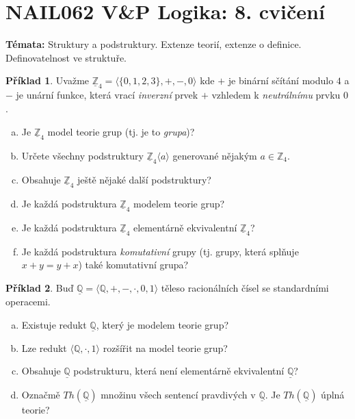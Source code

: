 \documentclass[a4paper]{article}
\theoremstyle{definition}
\newtheorem{problem}{Příklad}
\begin{document}
\section*{NAIL062 V\&P Logika: 8. cvičení}


\textbf{Témata:}
Struktury a podstruktury. Extenze teorií, extenze o definice. Definovatelnost ve struktuře.


\medskip\begin{problem}
    Uvažme $\underline{\mathbb{Z}}_4=\langle\{0,1,2,3\},+,-,0 \rangle$ kde $+$ je binární sčítání modulo $4$ a $-$ je unární funkce, která vrací \emph{inverzní} prvek $+$ vzhledem k \emph{neutrálnímu} prvku $0$.
    \begin{enumerate}[(a)]
        \item Je $\underline{\mathbb{Z}}_4$ model teorie grup (tj. je to \emph{grupa})?
        \item Určete všechny podstruktury $\underline{\mathbb{Z}}_4\langle a\rangle$ generované nějakým $a\in \mathbb{Z}_4$.
        \item Obsahuje $\underline{\mathbb{Z}}_4$ ještě nějaké další podstruktury?
        \item Je každá podstruktura $\underline{\mathbb{Z}}_4$ modelem teorie grup?
        \item Je každá podstruktura $\underline{\mathbb{Z}}_4$ elementárně ekvivalentní $\underline{\mathbb{Z}}_4$?
        \item Je každá podstruktura \emph{komutativní} grupy (tj. grupy, která splňuje $x+y=y+x$) také komutativní grupa?
    \end{enumerate}
\end{problem}
 
        
\medskip\begin{problem}
    Buď $\underline{\mathbb{Q}}=\langle\mathbb{Q},+,-,\cdot,0,1 \rangle$ těleso racionálních čísel se standardními operacemi.
    \begin{enumerate}[(a)]
    \item Existuje redukt $\underline{\mathbb{Q}}$, který je modelem teorie grup?
    \item Lze redukt $\langle\mathbb{Q},\cdot,1\rangle$ rozšířit na model teorie grup?
    \item Obsahuje $\underline{\mathbb{Q}}$ podstrukturu, která není elementárně ekvivalentní $\underline{\mathbb{Q}}$?
    \item Označmě $Th(\underline{\mathbb{Q}})$ množinu všech sentencí pravdivých v $\underline{\mathbb{Q}}$. Je $Th(\underline{\mathbb{Q}})$ úplná teorie?
    \end{enumerate}
\end{problem}
    
\end{document}
